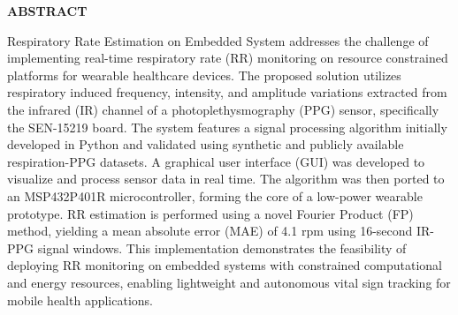 \documentclass[12pt,a4paper]{report}
\begin{document}
\newpage
{}
\setcounter{page}{2}
\begin{center}
\textbf {\large ABSTRACT}
\end{center}
\vspace{15pt}
Respiratory Rate Estimation on Embedded System addresses the challenge of implementing real-time respiratory rate (RR) monitoring on resource constrained platforms for wearable healthcare devices. The proposed solution utilizes respiratory induced frequency, intensity, and amplitude variations extracted from the infrared (IR) channel of a photoplethysmography (PPG) sensor, specifically the SEN-15219 board. The system features a signal processing algorithm initially developed in Python and validated using synthetic and publicly available respiration-PPG datasets. A graphical user interface (GUI) was developed to visualize and process sensor data in real time. The algorithm was then ported to an MSP432P401R microcontroller, forming the core of a low-power wearable prototype. RR estimation is performed using a novel Fourier Product (FP) method, yielding a mean absolute error (MAE) of 4.1 rpm using 16-second IR-PPG signal windows. This implementation demonstrates the feasibility of deploying RR monitoring on embedded systems with constrained computational and energy resources, enabling lightweight and autonomous vital sign tracking for mobile health applications.
 
\end{document}
